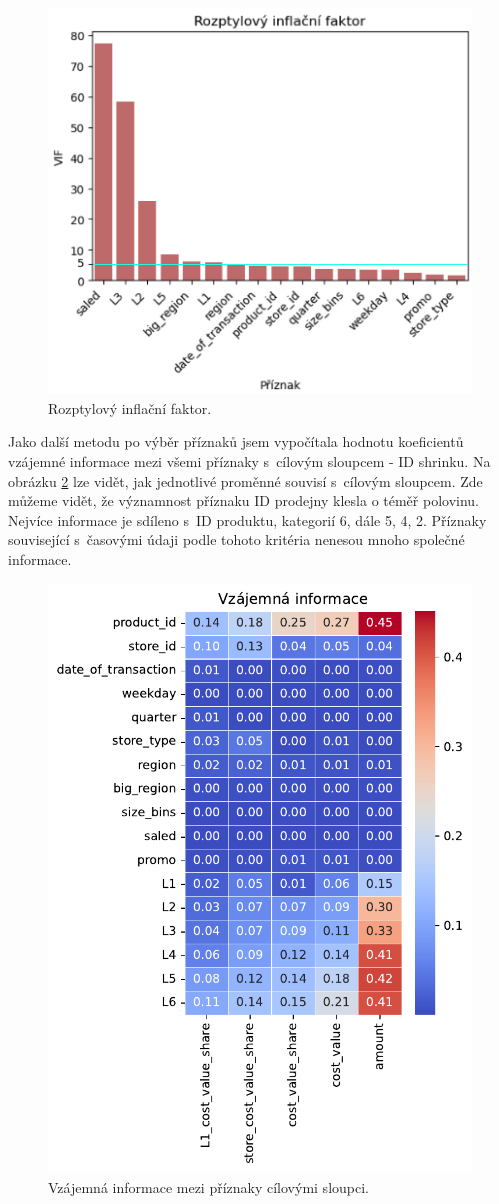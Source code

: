 \begin{figure}[h!]
      \centering
      \includegraphics[width=.6\textwidth]{obrazky/zntb/VIF2.png} %
      \caption{Rozptylový inflační faktor.}
      \label{obr:nb:vif}

    \end{figure}

Jako další metodu po výběr příznaků jsem vypočítala hodnotu koeficientů vzájemné informace mezi všemi příznaky s~cílovým sloupcem - ID shrinku. Na obrázku \ref*{obr:nb:MI_FS} lze vidět, jak jednotlivé proměnné souvisí s~cílovým sloupcem. 
Zde můžeme vidět, že významnost příznaku ID prodejny klesla o téměř polovinu. Nejvíce informace je sdíleno s~ID produktu, kategorií 6, dále 5, 4, 2. Příznaky související s~časovými údaji podle tohoto kritéria nenesou mnoho společné informace.

\begin{figure}[h!]
    \centering
    \includegraphics[width=.5\textwidth]{obrazky/pripravadat/matrix_MI-everything-SFF-stores-002.pdf}
    \caption{Vzájemná informace mezi příznaky cílovými sloupci.}
    \label{obr:nb:MI_FS}

  \end{figure}

